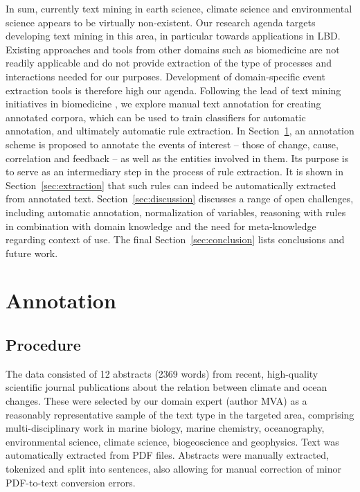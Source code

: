 \documentclass[10pt, a4paper]{article}
\begin{document}
In sum, currently text mining in earth science, climate science and environmental science appears to be virtually non-existent.
Our research agenda targets developing text mining in this area, in particular towards applications in LBD.
Existing approaches and tools from other domains such as biomedicine are not readily applicable and
do not provide extraction of the type of processes and interactions needed for our purposes.  
Development of domain-specific event extraction tools is therefore high our agenda.
Following the lead of text mining initiatives in biomedicine \cite{Kim2009Overview}, we explore manual text annotation for creating annotated corpora, which can be used to train classifiers for automatic annotation, and ultimately automatic rule extraction.
In Section~\ref{sec:annot}, an annotation scheme is proposed to annotate the events of interest --  those of change, cause, correlation and feedback -- as well as the entities involved in them.
Its purpose is to serve as an intermediary step in the process of rule extraction.
It is shown in Section~\ref{sec:extraction} that such rules can indeed be automatically extracted from annotated text.
Section~\ref{sec:discussion} discusses a range of open challenges, including automatic annotation, normalization of variables, reasoning with rules in combination with domain knowledge and the need for meta-knowledge regarding context of use.
The final Section~\ref{sec:conclusion} lists conclusions and future work.


\section{Annotation}
\label{sec:annot}

\subsection{Procedure}

The data consisted of 12 abstracts (2369 words) from recent, high-quality scientific journal publications about the relation between climate and ocean changes. 
These were selected by our domain expert (author MVA) as a reasonably representative sample of the text type in the targeted area, comprising multi-disciplinary work in marine biology, marine chemistry, oceanography, environmental science, climate science, biogeoscience and geophysics.
Text was automatically extracted from PDF files.
Abstracts were manually extracted, tokenized and split into sentences, also allowing for manual correction of minor PDF-to-text conversion errors.
\end{document}
